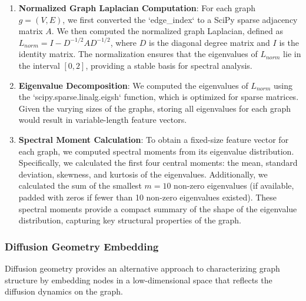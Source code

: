 \documentclass[twocolumn]{aastex631}
\begin{document}
\begin{enumerate}
    \item \textbf{Normalized Graph Laplacian Computation}: For each graph $g = (V, E)$, we first converted the `edge\_index` to a SciPy sparse adjacency matrix $A$. We then computed the normalized graph Laplacian, defined as $L_{norm} = I - D^{-1/2} A D^{-1/2}$, where $D$ is the diagonal degree matrix and $I$ is the identity matrix. The normalization ensures that the eigenvalues of $L_{norm}$ lie in the interval $[0, 2]$, providing a stable basis for spectral analysis.

    \item \textbf{Eigenvalue Decomposition}: We computed the eigenvalues of $L_{norm}$ using the `scipy.sparse.linalg.eigsh` function, which is optimized for sparse matrices. Given the varying sizes of the graphs, storing all eigenvalues for each graph would result in variable-length feature vectors.

    \item \textbf{Spectral Moment Calculation}: To obtain a fixed-size feature vector for each graph, we computed spectral moments from its eigenvalue distribution. Specifically, we calculated the first four central moments: the mean, standard deviation, skewness, and kurtosis of the eigenvalues. Additionally, we calculated the sum of the smallest $m=10$ non-zero eigenvalues (if available, padded with zeros if fewer than 10 non-zero eigenvalues existed). These spectral moments provide a compact summary of the shape of the eigenvalue distribution, capturing key structural properties of the graph.
\end{enumerate}

\subsubsection{Diffusion Geometry Embedding}
Diffusion geometry provides an alternative approach to characterizing graph structure by embedding nodes in a low-dimensional space that reflects the diffusion dynamics on the graph.
\end{document}
